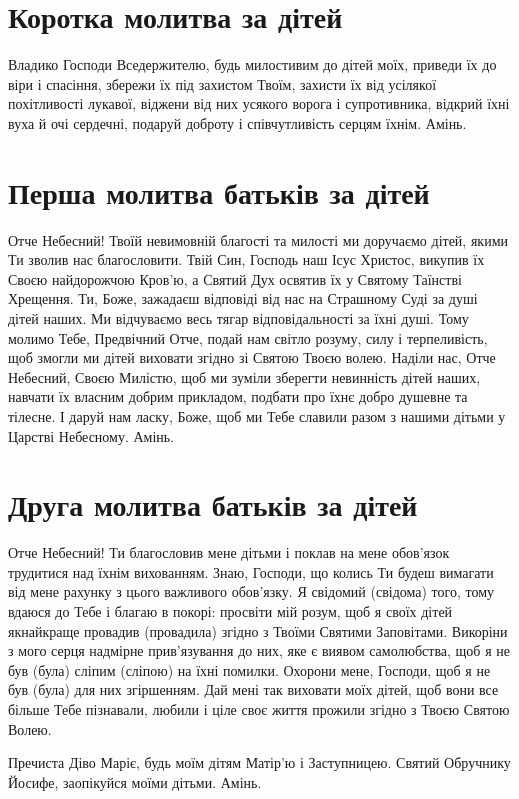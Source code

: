 \documentclass[chapters.tex]{subfiles}
\begin{document}
\section{Коротка молитва за дітей}
Владико Господи Вседержителю, будь милостивим до дітей моїх, приведи їх до віри і спасіння, збережи їх під захистом Твоїм, захисти їх від усілякої похітливості лукавої, віджени від них усякого ворога і супротивника, відкрий їхні вуха й очі сердечні, подаруй доброту і співчутливість серцям їхнім. Амінь.

\section{Перша молитва батьків за дітей}
Отче Небесний! Твоїй невимовній благості та милості ми доручаємо дітей, якими Ти зволив нас благословити. Твій Син, Господь наш Ісус Христос, викупив їх Своєю найдорожчою Кров’ю, а Святий Дух освятив їх у Святому Таїнстві Хрещення. Ти, Боже, зажадаєш відповіді від нас на Страшному Суді за душі дітей наших. Ми відчуваємо весь тягар відповідальності за їхні душі. Тому молимо Тебе, Предвічний Отче, подай нам світло розуму, силу і терпеливість, щоб змогли ми дітей виховати згідно зі Святою Твоєю волею. Наділи нас, Отче Небесний, Своєю Милістю, щоб ми зуміли зберегти невинність дітей наших, навчати їх власним добрим прикладом, подбати про їхнє добро душевне та тілесне. І даруй нам ласку, Боже, щоб ми Тебе славили разом з нашими дітьми у Царстві Небесному. Амінь.

\section{Друга молитва батьків за дітей}
Отче Небесний! Ти благословив мене дітьми і поклав на мене обов’язок трудитися над їхнім вихованням. Знаю, Господи, що колись Ти будеш вимагати від мене рахунку з цього важливого обов’язку. Я свідомий (свідома) того, тому вдаюся до Тебе і благаю в покорі: просвіти мій розум, щоб я своїх дітей якнайкраще провадив (провадила) згідно з Твоїми Святими Заповітами. Викоріни з мого серця надмірне прив’язування до них, яке є виявом самолюбства, щоб я не був (була) сліпим (сліпою) на їхні помилки. Охорони мене, Господи, щоб я не був (була) для них згіршенням. Дай мені так виховати моїх дітей, щоб вони все більше Тебе пізнавали, любили і ціле своє життя прожили згідно з Твоєю Святою Волею.

Пречиста Діво Маріє, будь моїм дітям Матір’ю і Заступницею. Святий Обручнику Йосифе, заопікуйся моїми дітьми. Амінь.
\end{document}
